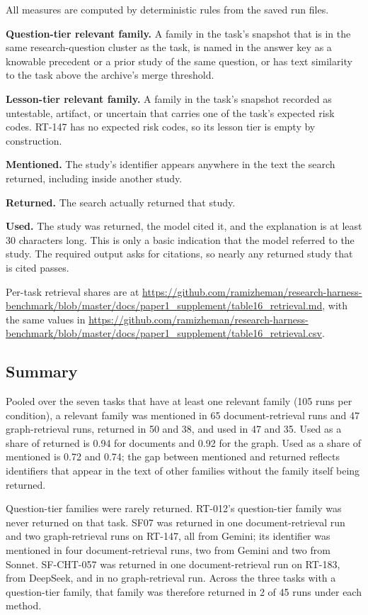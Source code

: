 \documentclass[11pt]{article}
\begin{document}
All measures are computed by deterministic rules from the saved run files.

\textbf{Question-tier relevant family.} A family in the task's snapshot that is in the same research-question cluster as the task, is named in the answer key as a knowable precedent or a prior study of the same question, or has text similarity to the task above the archive's merge threshold.

\textbf{Lesson-tier relevant family.} A family in the task's snapshot recorded as untestable, artifact, or uncertain that carries one of the task's expected risk codes. RT-147 has no expected risk codes, so its lesson tier is empty by construction.

\textbf{Mentioned.} The study's identifier appears anywhere in the text the search returned, including inside another study.

\textbf{Returned.} The search actually returned that study.

\textbf{Used.} The study was returned, the model cited it, and the explanation is at least 30 characters long. This is only a basic indication that the model referred to the study. The required output asks for citations, so nearly any returned study that is cited passes.

Per-task retrieval shares are at \url{https://github.com/ramizheman/research-harness-benchmark/blob/master/docs/paper1_supplement/table16_retrieval.md}, with the same values in \url{https://github.com/ramizheman/research-harness-benchmark/blob/master/docs/paper1_supplement/table16_retrieval.csv}.

\subsection*{Summary}

Pooled over the seven tasks that have at least one relevant family (105 runs per condition), a relevant family was mentioned in 65 document-retrieval runs and 47 graph-retrieval runs, returned in 50 and 38, and used in 47 and 35. Used as a share of returned is 0.94 for documents and 0.92 for the graph. Used as a share of mentioned is 0.72 and 0.74; the gap between mentioned and returned reflects identifiers that appear in the text of other families without the family itself being returned.

Question-tier families were rarely returned. RT-012's question-tier family was never returned on that task. SF07 was returned in one document-retrieval run and two graph-retrieval runs on RT-147, all from Gemini; its identifier was mentioned in four document-retrieval runs, two from Gemini and two from Sonnet. SF-CHT-057 was returned in one document-retrieval run on RT-183, from DeepSeek, and in no graph-retrieval run. Across the three tasks with a question-tier family, that family was therefore returned in 2 of 45 runs under each method.
\end{document}
